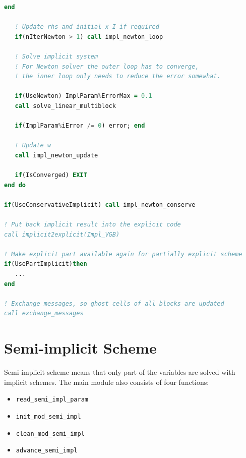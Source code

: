 \documentclass[11pt]{book} %
\begin{document}
\begin{lstlisting}[language=Fortran, caption=Part implicit scheme]
   end

   ! Update rhs and initial x_I if required
   if(nIterNewton > 1) call impl_newton_loop

   ! Solve implicit system
   ! For Newton solver the outer loop has to converge,                      
   ! the inner loop only needs to reduce the error somewhat.

   if(UseNewton) ImplParam%ErrorMax = 0.1
   call solve_linear_multiblock

   if(ImplParam%iError /= 0) error; end

   ! Update w
   call impl_newton_update

   if(IsConverged) EXIT
end do 

if(UseConservativeImplicit) call impl_newton_conserve

! Put back implicit result into the explicit code
call implicit2explicit(Impl_VGB)

! Make explicit part available again for partially explicit scheme
if(UsePartImplicit)then
   ...
end

! Exchange messages, so ghost cells of all blocks are updated
call exchange_messages

\end{lstlisting}

\section{Semi-implicit Scheme}
Semi-implicit scheme means that only part of the variables are solved with implicit schemes. The main module also consists of four functions:
\begin{itemize}
\item \verb|read_semi_impl_param|
\item \verb|init_mod_semi_impl|
\item \verb|clean_mod_semi_impl|
\item \verb|advance_semi_impl|
\end{itemize}
\end{document}
